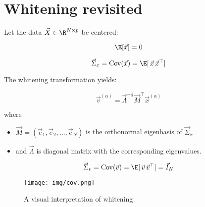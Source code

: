 
\section{Whitening revisited}


\begin{frame}{\secname}


Let the data $\vec X \in \R^{N \times p}$ be centered:

\begin{equation}
\label{eq:centered}
\E \lbrack \vec x \rbrack = 0 
\end{equation}


\begin{equation}
\label{eq:cov}
\vec \Sigma_x = \mathrm{Cov}(\vec x) = \E \lbrack \, \vec x \, \vec x^\top \rbrack 
\end{equation}

The whitening transformation yields:

\begin{equation}
\label{eq:whitening}
\vec v^{(\alpha)} = \vec \Lambda^{-\frac{1}{2}} \vec M^\top \vec x^{(\alpha)}
\end{equation}

where
\begin{itemize}
\item[] $\vec M = (\vec e_1, \vec e_2, \ldots,\vec e_N)$ is the orthonormal eigenbasis of $\vec \Sigma_x$
\item[] and $\vec\Lambda$ is diagonal matrix with the corresponding eigenvalues.
\end{itemize}

\pause


\pause


\svspace{-5mm}

\begin{equation}
\label{eq:covw}
\vec \Sigma_v = \mathrm{Cov}(\vec v) = \E \lbrack \, \vec v \, \vec v^\top \rbrack = \vec I_N
\end{equation}

\end{frame}

\begin{frame}{\secname}

\begin{figure}[ht]
\label{fig:sphering}
\texttt{[image: img/cov.png]}
\caption{A visual interpretation of whitening}
\end{figure}

\end{frame}
